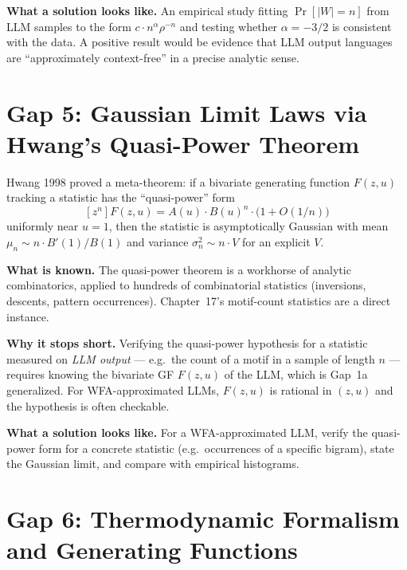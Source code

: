 \textbf{What a solution looks like.} An empirical study fitting $\Pr[|W|=n]$ from LLM samples to the form $c\cdot n^{\alpha}\rho^{-n}$ and testing whether $\alpha=-3/2$ is consistent with the data. A positive result would be evidence that LLM output languages are ``approximately context-free'' in a precise analytic sense.

\section{Gap 5: Gaussian Limit Laws via Hwang's Quasi-Power Theorem}
\label{ch18:gap5}

Hwang 1998 \cite{Hwang1998} proved a meta-theorem: if a bivariate generating function $F(z,u)$ tracking a statistic has the ``quasi-power'' form
$$
[z^n]F(z,u)=A(u)\cdot B(u)^n\cdot\bigl(1+O(1/n)\bigr)
$$
uniformly near $u=1$, then the statistic is asymptotically Gaussian with mean $\mu_n\sim n\cdot B'(1)/B(1)$ and variance $\sigma_n^2\sim n\cdot V$ for an explicit $V$.

\textbf{What is known.} The quasi-power theorem is a workhorse of analytic combinatorics, applied to hundreds of combinatorial statistics (inversions, descents, pattern occurrences). Chapter~17's motif-count statistics are a direct instance.

\textbf{Why it stops short.} Verifying the quasi-power hypothesis for a statistic measured on \emph{LLM output} --- e.g.\ the count of a motif in a sample of length $n$ --- requires knowing the bivariate GF $F(z,u)$ of the LLM, which is Gap~1a generalized. For WFA-approximated LLMs, $F(z,u)$ is rational in $(z,u)$ and the hypothesis is often checkable.

\textbf{What a solution looks like.} For a WFA-approximated LLM, verify the quasi-power form for a concrete statistic (e.g.\ occurrences of a specific bigram), state the Gaussian limit, and compare with empirical histograms.

\section{Gap 6: Thermodynamic Formalism and Generating Functions}
\label{ch18:gap6}

